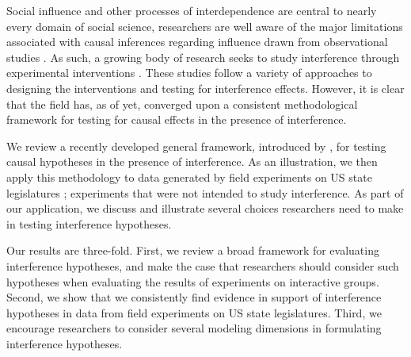 \documentclass[12pt]{article}
\begin{document}
Social influence and other processes of interdependence are central to nearly every domain of social science, researchers are well aware of the major limitations associated with causal inferences regarding influence drawn from observational studies \citep{Shalizi:2011}. As such, a growing body of research seeks to study interference through experimental interventions \citep[e.g., ][]{gerber2008,paluck2011,Bond:2012,muchnik2013,aral2014,bapna2015,Ben-AaronPAR}. These studies follow a variety of approaches to designing the interventions and testing for interference effects. However, it is clear that the field has, as of yet, converged upon a consistent methodological framework for testing for causal effects in the presence of interference.  

We review a recently developed general framework, introduced by \citet{bowers2012reasoning}, for testing causal hypotheses in the presence of interference. As an illustration, we then apply this methodology to data generated by field experiments on US state legislatures \citep{butler2011can,bergan2015call}; experiments that were not intended to study interference. As part of our application, we discuss and illustrate several choices researchers need to make in testing interference hypotheses.

Our results are three-fold. First, we review a broad framework for evaluating interference hypotheses, and make the case that researchers should consider such hypotheses when evaluating the results of experiments on interactive groups. Second, we show that we consistently find evidence in support of interference hypotheses in data from field experiments on US state legislatures. Third, we encourage researchers to consider several modeling dimensions in formulating interference hypotheses.



\end{document}
